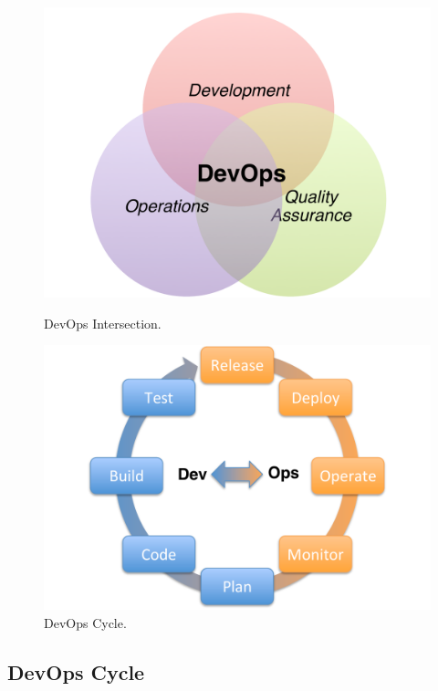 \begin{figure}[htb]
  \centering
   \begin{minipage}{.5\textwidth}
    \includegraphics[width=1.0\textwidth]{images/devops.pdf}
    \caption{DevOps Intersection.}
    \label{F:devops}
  \end{minipage}%
   \begin{minipage}{.5\textwidth}
     \includegraphics[width=1.0\textwidth]{images/devops-circle.pdf}
     \caption{DevOps Cycle.}
     \label{F:devops-circel}
  \end{minipage}%
\end{figure}

\subsection{DevOps Cycle}

